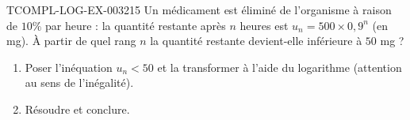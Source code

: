 \begin{exercice}{TCOMPL-LOG-EX-003}{2}{15}
Un médicament est éliminé de l'organisme à raison de $10\%$ par heure : la quantité restante après $n$ heures est $u_n = 500 \times 0{,}9^n$ (en mg). À partir de quel rang $n$ la quantité restante devient-elle inférieure à $50$ mg ?
\begin{enumerate}
  \item Poser l'inéquation $u_n < 50$ et la transformer à l'aide du logarithme (attention au sens de l'inégalité).
  \item Résoudre et conclure.
\end{enumerate}
\end{exercice}
